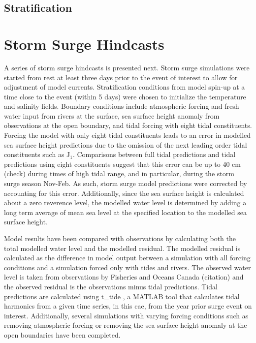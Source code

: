 \documentclass[pdftex,10pt]{article}
\begin{document}
\subsection{Stratification} 

\section{Storm Surge Hindcasts}\label{sec:storm}
A series of storm surge hindcasts is presented next. Storm surge simulations were started from rest at least three days prior to the event of interest to allow for adjustment of model currents. Stratification conditions from model spin-up at a time close to the event (within 5 days) were chosen to initialize the temperature and salinity fields. Boundary conditions include atmospheric forcing and fresh water input from rivers at the surface, sea surface height anomaly from observations at the open boundary, and tidal forcing with eight tidal constituents. Forcing the model with only eight tidal constituents leads to an error in modelled sea surface height predictions due to the omission of the next leading order tidal constituents such as J$_1$. Comparisons between full tidal predictions and tidal predictions using eight constituents suggest that this error can be up to 40 cm (check) during times of high tidal range, and in particular, during the storm surge season Nov-Feb. As such, storm surge model predictions were corrected by accounting for this error. Additionally, since the sea surface height is calculated about a zero reverence level, the modelled water level is determined by adding a long term average of mean sea level at the specified location to the modelled sea surface height.

Model results have been compared with observations by calculating both the total modelled water level and the modelled residual. The modelled residual is calculated as the difference in model output between a simulation with all forcing conditions and a simulation forced only with tides and rivers. The observed water level is taken from observations by Fisheries and Oceans Canada (citation) and the observed residual is the observations minus tidal predictions. Tidal predictions are calculated using t\_tide \citep{pawlowicz2002classical}, a MATLAB tool that calculates tidal harmonics from a given time series, in this cae, from the year prior surge event on interest. Additionally, several simulations with varying forcing conditions such as removing atmospheric forcing or removing the sea surface height anomaly at the open boundaries have been completed. 
\end{document}
